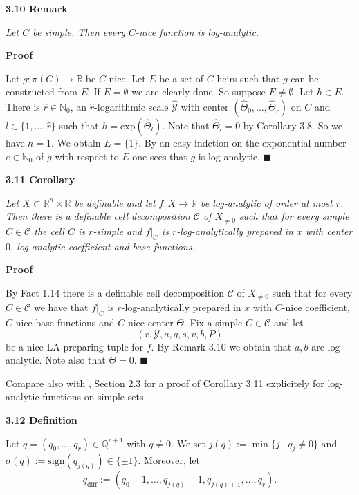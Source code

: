 \documentclass[12pt]{article}
\def\vs{\vspace}
\def\exp{\mathrm{exp}}
\begin{document}
\vs{0.5cm}
{\bf3.10 Remark}

\vs{0.1cm}
{\it Let $C$ be simple. Then every $C$-nice function is log-analytic.}

\vs{0.3cm}
{\bf Proof}

\vs{0.1cm}
Let $g:\pi(C) \to \mathbb{R}$ be $C$-nice. Let $E$ be a set of $C$-heirs such that $g$ can be constructed from $E$. If $E=\emptyset$ we are clearly done. So suppose $E \neq \emptyset$. Let $h \in E$. There is $\hat{r} \in \mathbb{N}_0$, an $\hat{r}$-logarithmic scale $\hat{\mathcal{Y}}$ with center $(\hat{\Theta}_0,...,\hat{\Theta}_{\hat{r}})$ on $C$ and $l \in \{1,...,\hat{r}\}$ such that $h=\exp(\hat{\Theta}_l)$. Note that $\hat{\Theta}_l=0$ by Corollary 3.8. So we have $h=1$. We obtain $E=\{1\}$. By an easy indction on the exponential number $e \in \mathbb{N}_0$ of $g$ with respect to $E$ one sees that $g$ is log-analytic. \hfill$\blacksquare$

\vs{0.5cm}
{\bf3.11 Corollary}

\vs{0.1cm}
{\it Let $X \subset \mathbb{R}^n \times \mathbb{R}$ be definable and let $f:X \to \mathbb{R}$ be log-analytic of order at most $r$. Then there is a definable cell decomposition $\mathcal{C}$ of $X_{\neq 0}$ such that for every simple $C \in \mathcal{C}$ the cell $C$ is $r$-simple and $f|_C$ is $r$-log-analytically prepared in $x$ with center $0$, log-analytic coefficient and base functions.}

\vs{0.3cm}
{\bf Proof}

\vs{0.1cm}
By Fact 1.14 there is a definable cell decomposition $\mathcal{C}$ of $X_{\neq 0}$ such that for every $C \in \mathcal{C}$ we have that $f|_C$ is $r$-log-analytically prepared in $x$ with $C$-nice coefficient, $C$-nice base functions and $C$-nice center $\Theta$. Fix a simple $C \in \mathcal{C}$ and let 
$$(r,\mathcal{Y},a,q,s,v,b,P)$$
be a nice LA-preparing tuple for $f$. By Remark 3.10 we obtain that $a,b$ are log-analytic. Note also that $\Theta=0$. \hfill$\blacksquare$

\vs{0.3cm}
Compare also with \cite{7}, Section 2.3 for a proof of Corollary 3.11 explicitely for log-analytic functions on simple sets.

\vs{0.5cm}
{\bf3.12 Definition}

\vs{0.1cm}
Let $q=(q_0,...,q_r)\in \mathbb{Q}^{r+1}$ with $q\neq 0$. We set
$j(q):=\min\{j\mid q_j\neq 0\}$ and $\sigma(q):=\mathrm{sign}(q_{j(q)})\in \{\pm 1\}$. 
Moreover, let
$$q_\mathrm{diff}:=(q_0-1,\ldots,q_{j(q)}-1,q_{j(q)+1},\ldots,q_r).$$ 
\end{document}
